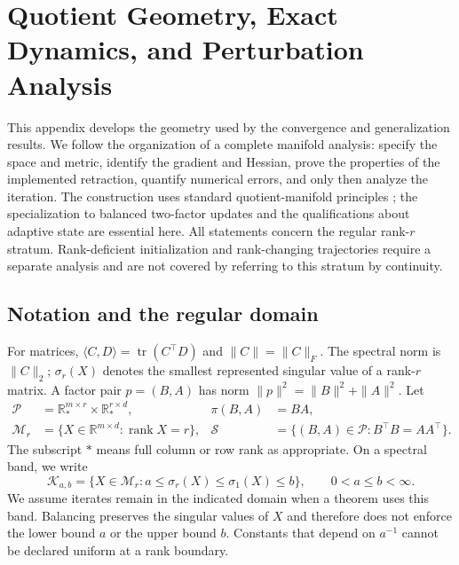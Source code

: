 \section{Quotient Geometry, Exact Dynamics, and Perturbation Analysis}
\label{app:geometry}

This appendix develops the geometry used by the convergence and generalization
results. We follow the organization of a complete manifold analysis: specify the
space and metric, identify the gradient and Hessian, prove the properties of the
implemented retraction, quantify numerical errors, and only then analyze the
iteration. The construction uses standard quotient-manifold principles
\cite{absil2008optimization,boumal2023introduction,mishra2014fixedrank}; the
specialization to balanced two-factor updates and the qualifications about
adaptive state are essential here. All statements concern the regular rank-$r$
stratum. Rank-deficient initialization and rank-changing trajectories require
a separate analysis and are not covered by referring to this stratum by
continuity.

\subsection{Notation and the regular domain}
For matrices, $\langle C,D\rangle=\operatorname{tr}(C^\top D)$ and
$\|C\|=\|C\|_F$. The spectral norm is $\|C\|_2$; $\sigma_r(X)$ denotes
the smallest represented singular value of a rank-$r$ matrix. A factor pair
$p=(B,A)$ has norm $\|p\|^2=\|B\|^2+\|A\|^2$. Let
\begin{align}
 \mathcal P&=\mathbb R_*^{m\times r}\times\mathbb R_*^{r\times d},&
 \pi(B,A)&=BA,\\
 \mathcal M_r&=\{X\in\mathbb R^{m\times d}:\operatorname{rank}X=r\},&
 \mathcal S&=\{(B,A)\in\mathcal P:B^\top B=AA^\top\}.
\end{align}
The subscript $*$ means full column or row rank as appropriate. On a spectral
band, we write
\begin{equation}
 \mathcal K_{a,b}=\{X\in\mathcal M_r:a\leq\sigma_r(X)\leq
 \sigma_1(X)\leq b\},\qquad 0<a\leq b<\infty.
 \label{eq:spectral-band}
\end{equation}
We assume iterates remain in the indicated domain when a theorem uses this
band. Balancing preserves the singular values of $X$ and therefore does not
enforce the lower bound $a$ or the upper bound $b$. Constants that depend on
$a^{-1}$ cannot be declared uniform at a rank boundary.

